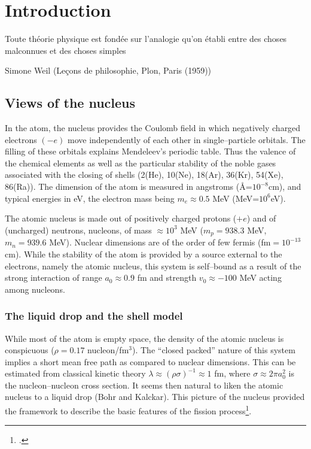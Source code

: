 	\chapter{Introduction}
	 \epigraph{Toute th\'eorie physique est fond\'ee sur l'analogie qu'on \'etabli entre des choses malconnues et des choses simples}{Simone Weil (Le\c{c}ons de philosophie, Plon, Paris (1959))}
\section{Views of the nucleus}
In the atom, the nucleus provides the Coulomb field in which negatively charged electrons $(-e)$ move independently of each other in single--particle orbitals. The filling of these orbitals explains Mendeleev's periodic table. Thus the valence of the chemical elements as well as the particular stability of the noble gases associated with the closing of shells (2(He), 10(Ne), 18(Ar), 36(Kr), 54(Xe), 86(Ra)). The dimension of the atom is measured in angstroms (\AA=$10^{-8}$cm), and typical energies in eV, the electron mass being $m_e\approx 0.5$ MeV (MeV=$10^6$eV).


The atomic nucleus is made out of positively charged protons ($+e$) and of (uncharged) neutrons, nucleons, of mass $\approx 10^3$ MeV ($m_p=938.3$ MeV, $m_n=939.6$ MeV). Nuclear dimensions are of the order of few fermis (fm$=10^{-13}$ cm). While the stability of the atom is provided by a source external to the electrons, namely the atomic nucleus, this system is  self--bound as a result of the strong interaction of range $a_0\approx 0.9$ fm and strength $v_0\approx -100$ MeV acting among nucleons. 
\subsection{The liquid drop and the shell model}\label{S1.1.1}
While most of the atom is empty space, the density of the atomic nucleus is conspicuous ($\rho=0.17$ nucleon/fm$^3$). The ``closed packed'' nature of this system implies a short mean free path as compared to nuclear dimensions. This can be estimated from classical kinetic theory $\lambda\approx(\rho\sigma)^{-1}\approx1$ fm, where $\sigma\approx 2\pi a_0^2$ is the nucleon--nucleon cross section. It seems then natural to liken the atomic nucleus to a liquid drop (Bohr and Kalckar).
This picture of the nucleus provided the framework to describe the basic features of the fission process\footnote{\cite{Meitner:39,Bohr:39}.}. 



